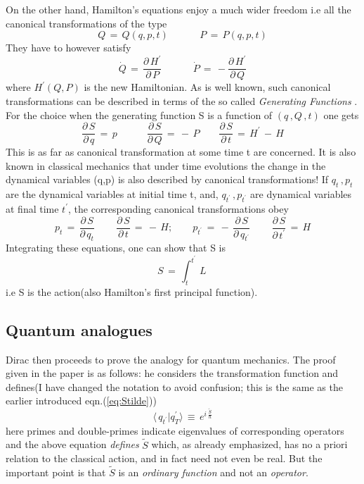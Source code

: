 \documentclass[a4paper]{JHEP3}
\newcommand{\be}{\begin{equation}}
\newcommand{\ee}{\end{equation}}
\begin{document}
On the other hand, Hamilton's equations enjoy a much wider freedom i.e all the canonical transformations of the type
\be
\label{eq:canonical2}
Q\,=\,Q(q,p,t)\quad\quad\quad\,P\,=\,P(q,p,t)
\ee
They have to however satisfy
\be
\label{eq:canonical3}
{\dot Q}\,=\,\frac{\partial\,H^\prime}{\partial\,P}\quad\quad\quad\,{\dot P}\,=\,-\frac{\partial\,H^\prime}{\partial\,Q}
\ee
where $H^\prime(Q,P)$ is the new Hamiltonian. As is well known, such canonical transformations can be described in terms of the so called
{\it Generating Functions} \cite{landau}. For the choice when the generating function S is a function of $(q\,,Q\,,t)$ one gets
\be\label{eq: generating}
\frac{\partial\,S}{\partial\,q}\,=\,p\quad\quad\quad \frac{\partial\,S}{\partial\,Q}\,=\,-\,P\quad\quad \frac{\partial\,S}{\partial\,t}\,=\,H^\prime\,-\,H
\ee
This is as far as canonical transformation at some time t are concerned. It is also known in classical mechanics that under time evolutions
the change in the dynamical variables (q,p) is also described by canonical transformations! If $q_t\,,p_t$ are the dynamical
variables at initial time t, and, $q_{t^\prime}\,,p_{t^\prime}$ are dynamical variables at final time $t^\prime$, the corresponding
canonical transformations obey
\be
\label{eq:canonicalevol}
p_t\,=\,\frac{\partial\,S}{\partial\,q_t}\quad\quad\,\frac{\partial\,S}{\partial\,t}\,=\,-\,H;\quad\quad p_{t^\prime}\,
=\,-\,\frac{\partial\,S}{\partial\,q_{t^\prime}}\quad\quad\,\frac{\partial\,S}{\partial\,t^\prime}\,=\,H
\ee
Integrating these equations, one can show that S is
\be
\label{eq:principal}
S\,=\,\int_t^{t^\prime}\,L\,
\ee
i.e S is the action(also Hamilton's first principal function).

\subsection{Quantum analogues}
Dirac then proceeds to prove the analogy for quantum mechanics. The proof given in the paper \cite{diracpaper} is as follows: he considers
the transformation function and defines(I have changed the notation to avoid confusion; this is the same as the earlier introduced 
eqn.(\ref{eq:Stilde}))
\be
\label{eq:qanalog}
\langle\,q_{t^\prime}|q_T^{\prime}\rangle\,
\equiv\, e^{i\,\frac{{\tilde S}}{\hbar}}
\ee
here primes and double-primes indicate eigenvalues of corresponding operators and the above equation {\it defines} ${\tilde S}$ which,
as already emphasized, has no a priori relation to the classical action, and in fact need not even be real. But the important point is 
that ${\tilde S}$ is an
\emph{ordinary function} and not an \emph{operator}.
\end{document}
